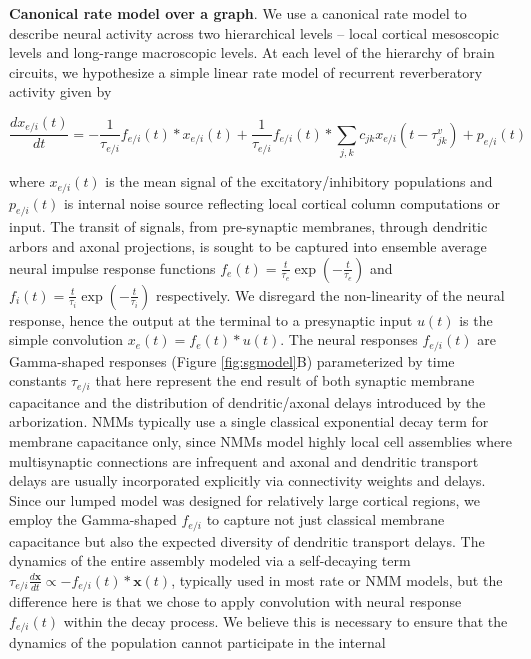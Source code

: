 \textbf{Canonical rate model over a graph}. We use a canonical rate
model to describe neural activity across two hierarchical levels --
local cortical mesoscopic levels and long-range macroscopic levels. At
each level of the hierarchy of brain circuits, we hypothesize a simple
linear rate model of recurrent reverberatory activity given by

\begin{equation}
\label{eq:rate_model}
\frac{dx_{e/i}(t)}{dt} = - \frac{1}{\tau_{e/i}} f_{e/i}(t) * x_{e/i}(t) + \frac{1}{\tau_{e/i}} f_{e/i}(t) * \sum_{j,k} c_{jk} x_{e/i} (t - \tau_{jk}^{v} ) + p_{e/i}(t)
\end{equation}


where $x_{e/i}(t)$ is the mean signal of the excitatory/inhibitory
populations and $p_{e/i}(t)$ is internal noise source reflecting local
cortical column computations or input. The transit of signals, from
pre-synaptic membranes, through dendritic arbors and axonal projections,
is sought to be captured into ensemble average neural impulse response
functions $f_{e}(t) = \frac{t}{\tau_{e}}\exp(-\frac{t}{\tau_{e}})$
and $f_{i}(t) = \frac{t}{\tau_{i}}\exp(-\frac{t}{\tau_{i}})$
respectively. We disregard the non-linearity of the neural response,
hence the output at the terminal to a presynaptic input $u(t)$ is the
simple convolution $x_{e}(t) = f_{e}(t)*u(t)$. The neural responses
$f_{e/i}(t)$ are Gamma-shaped responses (Figure \ref{fig:sgmodel}B)
parameterized by time constants $\tau_{e/i}$ that here represent the
end result of both synaptic membrane capacitance and the distribution of
dendritic/axonal delays introduced by the arborization. NMMs typically
use a single classical exponential decay term for membrane capacitance
only, since NMMs model highly local cell assemblies where multisynaptic
connections are infrequent and axonal and dendritic transport delays are
usually incorporated explicitly via connectivity weights and delays.
Since our lumped model was designed for relatively large cortical
regions, we employ the Gamma-shaped $f_{e/i}$ to capture not just
classical membrane capacitance but also the expected diversity of
dendritic transport delays. The dynamics of the entire assembly modeled
via a self-decaying term
$\tau_{e/i} \frac{d\mathbf{x}}{dt} \propto - f_{e/i}(t) * \mathbf{x}(t)$,
typically used in most rate or NMM models, but the difference here is
that we chose to apply convolution with neural response $f_{e/i}(t)$
within the decay process. We believe this is necessary to ensure that
the dynamics of the population cannot participate in the internal
